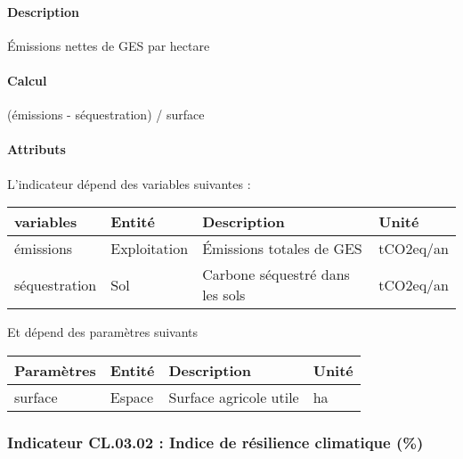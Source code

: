 \documentclass[
]{article}
\newenvironment{Shaded}{\begin{snugshade}}{\end{snugshade}}
\newcommand{\NormalTok}[1]{#1}
\begin{document}
\paragraph{Description}\label{description-21}

Émissions nettes de GES par hectare

\paragraph{Calcul}\label{calcul-21}

\begin{Shaded}
\begin{Highlighting}[]
\NormalTok{(émissions {-} séquestration) / surface}
\end{Highlighting}
\end{Shaded}

\paragraph{Attributs}\label{attributs-39}

L'indicateur dépend des variables suivantes :

\begin{longtable}[]{@{}llll@{}}
\toprule\noalign{}
\textbf{variables} & \textbf{Entité} & \textbf{Description} &
\textbf{Unité} \\
\midrule\noalign{}
\endhead
\bottomrule\noalign{}
\endlastfoot
émissions & Exploitation & Émissions totales de GES & tCO2eq/an \\
séquestration & Sol & Carbone séquestré dans les sols & tCO2eq/an \\
\end{longtable}

Et dépend des paramètres suivants

\begin{longtable}[]{@{}llll@{}}
\toprule\noalign{}
\textbf{Paramètres} & \textbf{Entité} & \textbf{Description} &
\textbf{Unité} \\
\midrule\noalign{}
\endhead
\bottomrule\noalign{}
\endlastfoot
surface & Espace & Surface agricole utile & ha \\
\end{longtable}

\subsubsection{Indicateur CL.03.02 : Indice de résilience climatique
(\%)}\label{indicateur-cl.03.02-indice-de-ruxe9silience-climatique}
\end{document}
